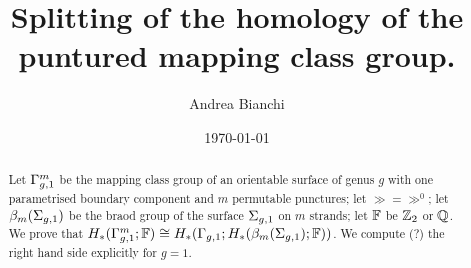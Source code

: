 \documentclass{amsart}
\theoremstyle{plain}
\theoremstyle{definition}
\begin{document}
\title{Splitting of the homology of the puntured mapping class group.}

\author{Andrea Bianchi}

\address{Mathematics Institute,
University of Bonn,
Endenicher Allee 60, Bonn,
Germany
}




\date{\today}



\begin{abstract}
Let $\Gamma_{g,1}^m$ be the mapping class group of an orientable surface of genus $g$ with one parametrised
boundary component and $m$ permutable punctures; let $\gg=\gg^0$; let $\beta_{m}(\Sigma_{g,1})$ be the braod group 
of the surface $\Sigma_{g,1}$ on $m$ strands; let $\mathbb{F}$ be $\mathbb{Z}_2$ or $\mathbb{Q}$. We prove that $H_*(\Gamma_{g,1}^m;\mathbb{F})\cong H_*(\Gamma_{g,1};H_*(\beta_{m}(\Sigma_{g,1});\mathbb{F}))$.
We compute (?) the right hand side explicitly for $g=1$.
\end{abstract}


\maketitle

















{}

\end{document}
